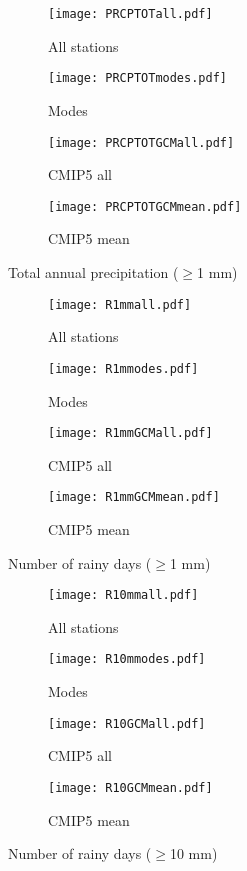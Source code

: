\documentclass{article}
\begin{document}
	\begin{figure}[H]
		\centering
		\begin{subfigure}{0.5\textwidth}
			\centering
			\texttt{[image: PRCPTOTall.pdf]}
			\caption{All stations}
		\end{subfigure}%
		\begin{subfigure}{0.5\textwidth}
			\centering
			\texttt{[image: PRCPTOTmodes.pdf]}
			\caption{Modes}
		\end{subfigure}
		\begin{subfigure}{0.5\textwidth}
		\centering
		\texttt{[image: PRCPTOTGCMall.pdf]}
		\caption{CMIP5 all}
	\end{subfigure}%
	\begin{subfigure}{0.5\textwidth}
		\centering
		\texttt{[image: PRCPTOTGCMmean.pdf]}
		\caption{CMIP5 mean}
	\end{subfigure}
		\caption{Total annual precipitation ($\geq$1 mm)}
		\label{PRCPTOT}
	\end{figure}

	\begin{figure}[H]
		\centering
		\begin{subfigure}{0.5\textwidth}
			\centering
			\texttt{[image: R1mmall.pdf]}
			\caption{All stations}
		\end{subfigure}%
		\begin{subfigure}{0.5\textwidth}
			\centering
			\texttt{[image: R1mmodes.pdf]}
			\caption{Modes}
		\end{subfigure}
		\begin{subfigure}{0.5\textwidth}
			\centering
			\texttt{[image: R1mmGCMall.pdf]}
			\caption{CMIP5 all}
		\end{subfigure}%
		\begin{subfigure}{0.5\textwidth}
			\centering
			\texttt{[image: R1mmGCMmean.pdf]}
			\caption{CMIP5 mean}
		\end{subfigure}
		\caption{Number of rainy days ($\geq$1 mm)}
		\label{R1mm}
	\end{figure}
	
	\begin{figure}[H]
		\centering
		\begin{subfigure}{0.5\textwidth}
			\centering
			\texttt{[image: R10mmall.pdf]}
			\caption{All stations}
		\end{subfigure}%
		\begin{subfigure}{0.5\textwidth}
			\centering
			\texttt{[image: R10mmodes.pdf]}
			\caption{Modes}
		\end{subfigure}
		\begin{subfigure}{0.5\textwidth}
			\centering
			\texttt{[image: R10GCMall.pdf]}
			\caption{CMIP5 all}
		\end{subfigure}%
		\begin{subfigure}{0.5\textwidth}
			\centering
			\texttt{[image: R10GCMmean.pdf]}
			\caption{CMIP5 mean}
		\end{subfigure}
		\caption{Number of rainy days ($\geq$10 mm)}
		\label{R10mm}
	\end{figure}
\end{document}
